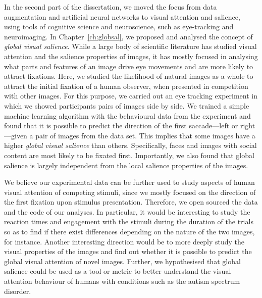 {In the second part of the dissertation, we moved the focus from data augmentation and artificial neural networks to visual attention and salience, using tools of cognitive science and neuroscience, such as eye-tracking and neuroimaging. In Chapter~\ref{ch:globsal}, we proposed and analysed the concept of \textit{global visual salience}. While a large body of scientific literature has studied visual attention and the salience properties of images, it has mostly focused in analysing what parts and features of an image drive eye movements and are more likely to attract fixations. Here, we studied the likelihood of natural images as a whole to attract the initial fixation of a human observer, when presented in competition with other images. For this purpose, we carried out an eye tracking experiment in which we showed participants pairs of images side by side. We trained a simple machine learning algorithm with the behavioural data from the experiment and found that it is possible to predict the direction of the first saccade---left or right---given a pair of images from the data set. This implies that some images have a higher \textit{global visual salience} than others. Specifically, faces and images with social content are most likely to be fixated first. Importantly, we also found that global salience is largely independent from the local salience properties of the images. 

We believe our experimental data can be further used to study aspects of human visual attention of competing stimuli, since we mostly focused on the direction of the first fixation upon stimulus presentation. Therefore, we open sourced the data and the code of our analyses. In particular, it would be interesting to study the reaction times and engagement with the stimuli during the duration of the trials so as to find if there exist differences depending on the nature of the two images, for instance. Another interesting direction would be to more deeply study the visual properties of the images and find out whether it is possible to predict the global visual attention of novel images. Further, we hypothesised that global salience could be used as a tool or metric to better understand the visual attention behaviour of humans with conditions such as the autism spectrum disorder.

}
